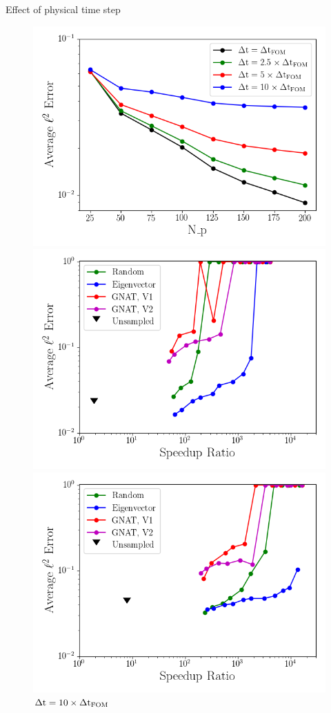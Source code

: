 \documentclass[]{beamer}
\begin{document}
\begin{frame}[noframenumbering]{Effect of physical time step}
	\begin{figure}
		\centering
		\includegraphics[width=0.37\linewidth]{Images/experiments/cvrc/backup/unsampled_avg_mode_Average_errorRaw.png}

		\begin{minipage}{0.4\linewidth}
			\includegraphics[width=0.99\linewidth]{Images/experiments/cvrc/backup/sampled_dt2p5e-7_Average_errorRaw_pareto.png}
			\caption*{\scriptsize{$\dt = 2.5 \times \dtFOM$}}
		\end{minipage}
		\begin{minipage}{0.4\linewidth}
			\includegraphics[width=0.99\linewidth]{Images/experiments/cvrc/backup/sampled_dt1e-6_Average_errorRaw_pareto.png}
			\caption*{\scriptsize{$\Delta \text{t} = 10 \times \Delta \text{t}_{\text{FOM}}$}}
		\end{minipage}
	\end{figure}
\end{frame}
\end{document}
